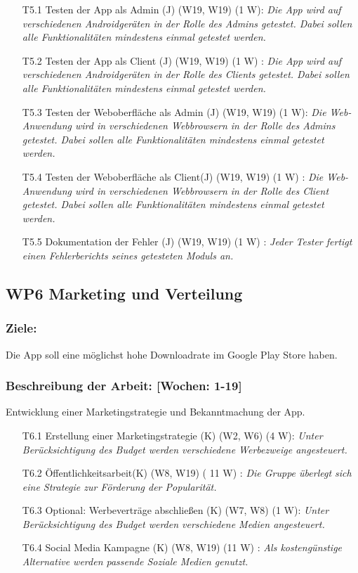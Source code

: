 \documentclass{scrreprt}
\begin{document}
\begin{enumerate}
\item [T5.1] Testen der App als Admin (J) (W19, W19) (1 W): \emph{ Die App wird auf verschiedenen Androidgeräten in der Rolle des Admins getestet. Dabei sollen alle Funktionalitäten mindestens einmal getestet werden.}
\item [T5.2] Testen der App als Client (J) (W19, W19) (1 W) : \emph{ Die App wird auf verschiedenen Androidgeräten in der Rolle des Clients getestet. Dabei sollen alle Funktionalitäten mindestens einmal getestet werden.}
\item [T5.3] Testen der Weboberfläche als Admin (J) (W19, W19) (1 W): \emph{ Die Web-Anwendung wird in verschiedenen Webbrowsern in der Rolle des Admins getestet. Dabei sollen alle Funktionalitäten mindestens einmal getestet werden.}
\item [T5.4] Testen der Weboberfläche als Client(J) (W19, W19) (1 W) : \emph{ Die Web-Anwendung wird in verschiedenen Webbrowsern in der Rolle des Client getestet. Dabei sollen alle Funktionalitäten mindestens einmal getestet werden.}
\item [T5.5] Dokumentation der Fehler (J) (W19, W19) (1 W) : \emph{Jeder Tester fertigt einen Fehlerberichts seines getesteten Moduls an.}
\end{enumerate}

\subsection*{WP6 Marketing und Verteilung}

\subsubsection{Ziele:} Die App soll eine möglichst hohe Downloadrate im Google Play Store haben.
\subsubsection{Beschreibung der Arbeit: [Wochen: 1-19]} Entwicklung einer Marketingstrategie und Bekanntmachung der App.

\begin{enumerate}
\item [T6.1] Erstellung einer Marketingstrategie (K) (W2, W6) (4 W): \emph{Unter Berücksichtigung des Budget werden verschiedene Werbezweige angesteuert.}
\item [T6.2] Öffentlichkeitsarbeit(K) (W8, W19) ( 11 W) : \emph{ Die Gruppe überlegt sich eine Strategie zur Förderung der Popularität.}
\item [T6.3] Optional: Werbeverträge abschließen (K) (W7, W8) (1 W): \emph{ Unter Berücksichtigung des Budget werden verschiedene Medien angesteuert.}
\item [T6.4] Social Media Kampagne (K) (W8, W19) (11 W) : \emph{ Als kostengünstige Alternative werden passende Soziale Medien genutzt.}
\end{enumerate}
\end{document}
